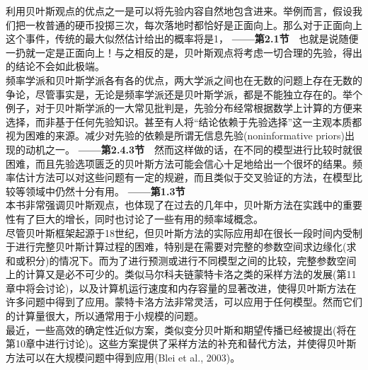 \documentclass[b5paper]{book}
\numberwithin{equation}{chapter}
\begin{document}
{	\indent 利用贝叶斯观点的优点之一是可以将先验内容自然地包含进来。举例而言，假设我们把一枚普通的硬币投掷三次，每次落地时都恰好是正面向上。那么对于正面向上这个事件，传统的最大似然估计给出的概率将是1，\color{red} \textbf{——第2.1节}　\color{black}也就是说随便一扔就一定是正面向上！与之相反的是，贝叶斯观点将考虑一切合理的先验，得出的结论不会如此极端。\\
	\indent 频率学派和贝叶斯学派各有各的优点，两大学派之间也在无数的问题上存在无数的争论，尽管事实是，无论是频率学派还是贝叶斯学派，都是不能独立存在的。举个例子，对于贝叶斯学派的一大常见批判是，先验分布经常根据数学上计算的方便来选择，而非基于任何先验知识。甚至有人将“结论依赖于先验选择”这一主观本质都视为困难的来源。减少对先验的依赖是所谓无信息先验(noninformative priors)出现的动机之一。\color{red} \textbf{——第2.4.3节}　\color{black}然而这样做的话，在不同的模型进行比较时就很困难，而且先验选项匮乏的贝叶斯方法可能会信心十足地给出一个很坏的结果。频率估计方法可以对这些问题有一定的规避，而且类似于交叉验证的方法，在模型比较等领域中仍然十分有用。\color{red} \textbf{——第1.3节}　\color{black}\\
	\indent 本书非常强调贝叶斯观点，也体现了在过去的几年中，贝叶斯方法在实践中的重要性有了巨大的增长，同时也讨论了一些有用的频率域概念。\\
	\indent 尽管贝叶斯框架起源于18世纪，但贝叶斯方法的实际应用却在很长一段时间内受制于进行完整贝叶斯计算过程的困难，特别是在需要对完整的参数空间求边缘化(求和或积分)的情况下。而为了进行预测或进行不同模型之间的比较，完整参数空间上的计算又是必不可少的。类似马尔科夫链蒙特卡洛之类的采样方法的发展(第11章中将会讨论)，以及计算机运行速度和内存容量的显著改进，使得贝叶斯方法在许多问题中得到了应用。蒙特卡洛方法非常灵活，可以应用于任何模型。然而它们的计算量很大，所以通常用于小规模的问题。\\
	\indent 最近，一些高效的确定性近似方案，类似变分贝叶斯和期望传播已经被提出(将在第10章中进行讨论)。这些方案提供了采样方法的补充和替代方法，并使得贝叶斯方法可以在大规模问题中得到应用(Blei et al., 2003)。
	}
\end{document}
